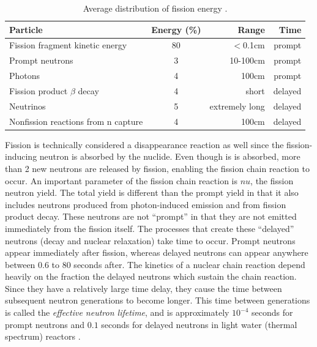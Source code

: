 \begin{table}[h]
\centering
\caption{Average distribution of fission energy \cite{duderstadt}.\label{fission_dist}}
\begin{tabular}{| l | c | r | r |}
\hline
Particle & Energy (\%) & Range & Time \\
\hline
Fission fragment kinetic energy & 80 & $<$0.1cm & prompt \\
\hline
Prompt neutrons & 3 & 10-100cm & prompt \\
\hline
Photons & 4 & 100cm & prompt \\
\hline
Fission product $\beta$ decay & 4 & short & delayed \\
\hline
Neutrinos &  5 & extremely long & delayed \\
\hline
Nonfission reactions from n capture & 4 & 100cm & delayed \\
\hline
\end{tabular}
\end{table}

Fission is technically considered a disappearance reaction as well since the fission-inducing neutron is absorbed by the nuclide.  Even though is is absorbed, more than 2 new neutrons are released by fission, enabling the fission chain reaction to occur.  An important parameter of the fission chain reaction is $nu$, the fission neutron yield.    The total yield is different than the prompt yield in that it also includes neutrons produced from photon-induced emission and from fission product decay.  These neutrons are not ``prompt'' in that they are not emitted immediately from the fission itself.  The processes that create these ``delayed'' neutrons (decay and nuclear relaxation) take time to occur.  Prompt neutrons appear immediately after fission, whereas delayed neutrons can appear anywhere between 0.6 to 80 seconds after.  The kinetics of a nuclear chain reaction depend heavily on the fraction the delayed neutrons which sustain the chain reaction.  Since they have a relatively large time delay, they cause the time between subsequent neutron generations to become longer.  This time between generations is called the \emph{effective neutron lifetime}, and is approximately $10^{-4}$ seconds for prompt neutrons and $0.1$ seconds for delayed neutrons in light water (thermal spectrum) reactors \cite{duderstadt}.  

